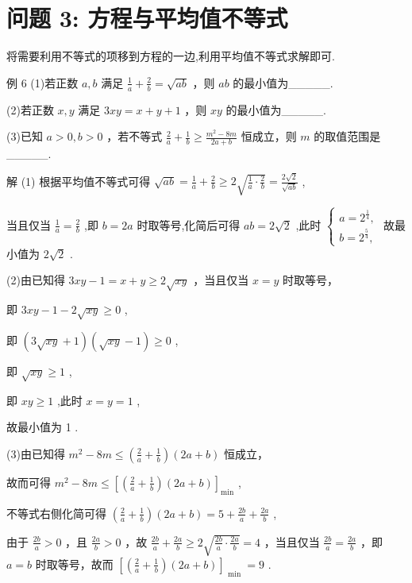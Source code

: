 \documentclass[10pt]{article}
\begin{document}
\section*{问题 3: 方程与平均值不等式}

将需要利用不等式的项移到方程的一边,利用平均值不等式求解即可.

例 6 (1)若正数 \(a,b\) 满足 \(\frac{1}{a} + \frac{2}{b} = \sqrt{ab}\) ，则 \({ab}\) 的最小值为\_\_\_\_\_.

(2)若正数 \(x,y\) 满足 \({3xy} = x + y + 1\) ，则 \({xy}\) 的最小值为\_\_\_\_\_.

(3)已知 \(a > 0,b > 0\) ，若不等式 \(\frac{2}{a} + \frac{1}{b} \geq  \frac{{m}^{2} - {8m}}{{2a} + b}\) 恒成立，则 \(m\) 的取值范围是\_\_\_\_\_.

解 (1) 根据平均值不等式可得 \(\sqrt{ab} = \frac{1}{a} + \frac{2}{b} \geq  2\sqrt{\frac{1}{a} \cdot  \frac{2}{b}} = \frac{2\sqrt{2}}{\sqrt{ab}}\) ,

当且仅当 \(\frac{1}{a} = \frac{2}{b}\) ,即 \(b = {2a}\) 时取等号,化简后可得 \({ab} = 2\sqrt{2}\) ,此时 \(\left\{  \begin{array}{l} a = {2}^{\frac{1}{4}}, \\  b = {2}^{\frac{5}{4}}, \end{array}\right.\) 故最小值为 \(2\sqrt{2}\) .

(2)由已知得 \({3xy} - 1 = x + y \geq  2\sqrt{xy}\) ，当且仅当 \(x = y\) 时取等号，

即 \({3xy} - 1 - 2\sqrt{xy} \geq  0\) ,

即 \(\left( {3\sqrt{xy} + 1}\right) \left( {\sqrt{xy} - 1}\right)  \geq  0\) ,

即 \(\sqrt{xy} \geq  1\) ,

即 \({xy} \geq  1\) ,此时 \(x = y = 1\) ,

故最小值为 1 .

(3)由已知得 \({m}^{2} - {8m} \leq  \left( {\frac{2}{a} + \frac{1}{b}}\right) \left( {{2a} + b}\right)\) 恒成立，

故而可得 \({m}^{2} - {8m} \leq  {\left\lbrack  \left( \frac{2}{a} + \frac{1}{b}\right) \left( 2a + b\right) \right\rbrack  }_{\min }\) ,

不等式右侧化简可得 \(\left( {\frac{2}{a} + \frac{1}{b}}\right) \left( {{2a} + b}\right)  = 5 + \frac{2b}{a} + \frac{2a}{b}\) ,

由于 \(\frac{2b}{a} > 0\) ，且 \(\frac{2a}{b} > 0\) ，故 \(\frac{2b}{a} + \frac{2a}{b} \geq  2\sqrt{\frac{2b}{a} \cdot  \frac{2a}{b}} = 4\) ，当且仅当 \(\frac{2b}{a} = \frac{2a}{b}\) ，即 \(a = b\) 时取等号，故而 \({\left\lbrack  \left( \frac{2}{a} + \frac{1}{b}\right) \left( 2a + b\right) \right\rbrack  }_{\text{ min }} = 9\) .
\end{document}
